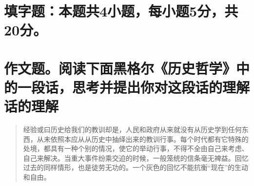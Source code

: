 \documentclass[answer=true,countunit=section,paperprint,sheetsize,scoretable,scratchpaper=false,sealrule=false,headfoot=false]{simplexam}
\begin{document}
%


\section{填字题：本题共4小题，每小题5分，共20分。}






\section{作文题。阅读下面黑格尔《历史哲学》中的一段话，思考并提出你对这段话的理解话的理解}


\begin{question}
\begin{quotation}
  \large \kaishu 经验或曰历史给我们的教训却是，人民和政府从来就没有从历史学到任何东西，从未依照本应从从历史中抽绎出来的教训行事。每个时代都有它特殊的处境，都具有一种个别的情况，使它的举动行事，不得不全由自己来考虑、自己来解决。当重大事件纷乘交迫的时候，一般笼统的信条毫无裨益。回忆过去的同样情形，也是徒劳无功的。一个灰色的回忆不能抗衡``现在''的生动和自由。
\end{quotation}
\answerpoints
\end{question}

%
\end{document}
